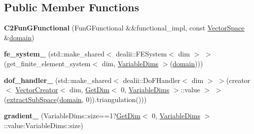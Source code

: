 \subsection*{Public Member Functions}
\begin{DoxyCompactItemize}
\item 
\hypertarget{classSpacy_1_1dealII_1_1C2FunGFunctional_3_01FunGFunctional_00_01dim_00_01VariableDim_3_01variable__dims_8_8_8_4_01_4_a4ef60d584e074d99d6959d3587649a58}{{\bfseries C2\-Fun\-G\-Functional} (Fun\-G\-Functional \&\&functional\-\_\-impl, const \hyperlink{classSpacy_1_1VectorSpace}{Vector\-Space} \&\hyperlink{classSpacy_1_1FunctionalBase_a2d3397deb9fa1ad85ed04e37a03b3aa6}{domain})}\label{classSpacy_1_1dealII_1_1C2FunGFunctional_3_01FunGFunctional_00_01dim_00_01VariableDim_3_01variable__dims_8_8_8_4_01_4_a4ef60d584e074d99d6959d3587649a58}

\item 
\hypertarget{classSpacy_1_1dealII_1_1C2FunGFunctional_3_01FunGFunctional_00_01dim_00_01VariableDim_3_01variable__dims_8_8_8_4_01_4_a5648bf746ea5cdf3c2ff676e385dbf48}{{\bfseries fe\-\_\-system\-\_\-} (std\-::make\-\_\-shared$<$ dealii\-::\-F\-E\-System$<$ dim $>$ $>$(get\-\_\-finite\-\_\-element\-\_\-system$<$ dim, \hyperlink{structSpacy_1_1dealII_1_1VariableDim}{Variable\-Dims} $>$(\hyperlink{classSpacy_1_1FunctionalBase_a2d3397deb9fa1ad85ed04e37a03b3aa6}{domain})))}\label{classSpacy_1_1dealII_1_1C2FunGFunctional_3_01FunGFunctional_00_01dim_00_01VariableDim_3_01variable__dims_8_8_8_4_01_4_a5648bf746ea5cdf3c2ff676e385dbf48}

\item 
\hypertarget{classSpacy_1_1dealII_1_1C2FunGFunctional_3_01FunGFunctional_00_01dim_00_01VariableDim_3_01variable__dims_8_8_8_4_01_4_a766b9a7820e812a7bdcc5641d27d5413}{{\bfseries dof\-\_\-handler\-\_\-} (std\-::make\-\_\-shared$<$ dealii\-::\-Do\-F\-Handler$<$ dim $>$ $>$(creator$<$ \hyperlink{classSpacy_1_1dealII_1_1VectorCreator}{Vector\-Creator}$<$ dim, \hyperlink{structSpacy_1_1dealII_1_1GetDim}{Get\-Dim}$<$ 0, \hyperlink{structSpacy_1_1dealII_1_1VariableDim}{Variable\-Dims} $>$\-::value $>$ $>$(\hyperlink{group__ProductSpaceGroup_ga6054e5c78652ac4959f5d521acadd86a}{extract\-Sub\-Space}(\hyperlink{classSpacy_1_1FunctionalBase_a2d3397deb9fa1ad85ed04e37a03b3aa6}{domain}, 0)).triangulation()))}\label{classSpacy_1_1dealII_1_1C2FunGFunctional_3_01FunGFunctional_00_01dim_00_01VariableDim_3_01variable__dims_8_8_8_4_01_4_a766b9a7820e812a7bdcc5641d27d5413}

\item 
\hypertarget{classSpacy_1_1dealII_1_1C2FunGFunctional_3_01FunGFunctional_00_01dim_00_01VariableDim_3_01variable__dims_8_8_8_4_01_4_a50e6c19bfda84bdaf4f2a89c4d9eb6f0}{{\bfseries gradient\-\_\-} (Variable\-Dims\-::size==1?\hyperlink{structSpacy_1_1dealII_1_1GetDim}{Get\-Dim}$<$ 0, \hyperlink{structSpacy_1_1dealII_1_1VariableDim}{Variable\-Dims} $>$\-::value\-:\-Variable\-Dims\-::size)}\label{classSpacy_1_1dealII_1_1C2FunGFunctional_3_01FunGFunctional_00_01dim_00_01VariableDim_3_01variable__dims_8_8_8_4_01_4_a50e6c19bfda84bdaf4f2a89c4d9eb6f0}


\end{DoxyCompactItemize}
